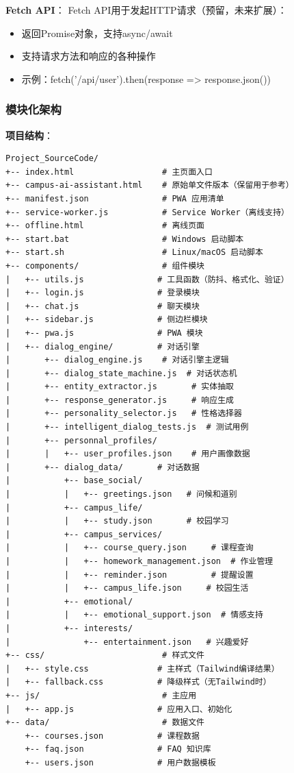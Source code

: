 \documentclass[12pt,a4paper]{article}
\begin{document}
\textbf{Fetch API}：
Fetch API用于发起HTTP请求（预留，未来扩展）：

\begin{itemize}
    \item 返回Promise对象，支持async/await
    \item 支持请求方法和响应的各种操作
    \item 示例：fetch('/api/user').then(response => response.json())
\end{itemize}

\subsubsection{模块化架构}

\textbf{项目结构}：

\begin{verbatim}
Project_SourceCode/
+-- index.html                  # 主页面入口
+-- campus-ai-assistant.html    # 原始单文件版本（保留用于参考）
+-- manifest.json               # PWA 应用清单
+-- service-worker.js           # Service Worker（离线支持）
+-- offline.html                # 离线页面
+-- start.bat                   # Windows 启动脚本
+-- start.sh                    # Linux/macOS 启动脚本
+-- components/                 # 组件模块
|   +-- utils.js               # 工具函数（防抖、格式化、验证）
|   +-- login.js               # 登录模块
|   +-- chat.js                # 聊天模块
|   +-- sidebar.js             # 侧边栏模块
|   +-- pwa.js                 # PWA 模块
|   +-- dialog_engine/         # 对话引擎
|       +-- dialog_engine.js    # 对话引擎主逻辑
|       +-- dialog_state_machine.js  # 对话状态机
|       +-- entity_extractor.js       # 实体抽取
|       +-- response_generator.js     # 响应生成
|       +-- personality_selector.js   # 性格选择器
|       +-- intelligent_dialog_tests.js  # 测试用例
|       +-- personnal_profiles/
|       |   +-- user_profiles.json    # 用户画像数据
|       +-- dialog_data/       # 对话数据
|           +-- base_social/
|           |   +-- greetings.json   # 问候和道别
|           +-- campus_life/
|           |   +-- study.json       # 校园学习
|           +-- campus_services/
|           |   +-- course_query.json     # 课程查询
|           |   +-- homework_management.json  # 作业管理
|           |   +-- reminder.json         # 提醒设置
|           |   +-- campus_life.json     # 校园生活
|           +-- emotional/
|           |   +-- emotional_support.json  # 情感支持
|           +-- interests/
|               +-- entertainment.json   # 兴趣爱好
+-- css/                        # 样式文件
|   +-- style.css              # 主样式（Tailwind编译结果）
|   +-- fallback.css           # 降级样式（无Tailwind时）
+-- js/                         # 主应用
|   +-- app.js                 # 应用入口、初始化
+-- data/                       # 数据文件
    +-- courses.json           # 课程数据
    +-- faq.json               # FAQ 知识库
    +-- users.json             # 用户数据模板
\end{verbatim}
\end{document}
